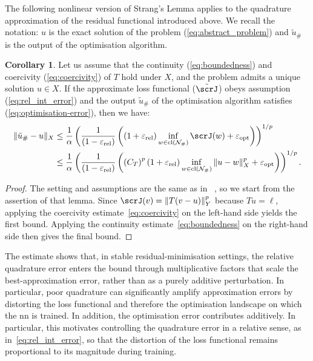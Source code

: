 \documentclass[oneside,reqno,11pt,a4paper]{amsart}
\theoremstyle{definition}
\newtheorem{corollary}{Corollary}[section]
\newcommand{\norm}[1]{\left\lVert #1 \right\rVert}
\begin{document}
The following nonlinear version of Strang's Lemma applies to the quadrature
approximation of the residual functional introduced above. We recall the
notation: $u$ is the exact solution of the problem
(\ref{eq:abstract_problem}) and $\tilde{u}_{\#}$ is the output of the
optimisation algorithm. 
\begin{corollary} \label{corollary:nonlinear-strang-rel}
  Let us assume that the continuity (\ref{eq:boundedness}) and coercivity
  (\ref{eq:coercivity}) of $T$ hold under $X$, and the problem admits a unique
  solution $u \in X$. If the approximate loss functional ($\tilde{\scrJ}$)
  obeys assumption (\ref{eq:rel_int_error}) and the output $\tilde{u}_{\#}$ of
  the optimisation algorithm satisfies (\ref{eq:optimisation-error}), then we have:
\begin{align}
  \| \tilde{u}_{\#} - u\|_X  
  & \leq \frac{1}{\alpha} \left(\frac{1}{\left(1 - \varepsilon_{\mathrm{rel}}\right)} \left( \left(1 + \varepsilon_{\mathrm{rel}}\right) \inf_{w \in \operatorname{cl}(\mathcal{N}_{\#})} \scrJ(w) + \varepsilon_{\mathrm{opt}} \right)\right)^{1/p} \\ 
  & \leq  \frac{1}{\alpha} \left(\frac{1}{\left(1 - \varepsilon_{\mathrm{rel}}\right)} \left( \left(C_T\right)^p \left(1 + \varepsilon_{\mathrm{rel}}\right) \inf_{w \in \operatorname{cl}(\mathcal{N}_{\#})} \|u - w\|^p_X + \varepsilon_{\mathrm{opt}} \right)\right)^{1/p}.
\end{align} 
\end{corollary}
\begin{proof}
  The setting and assumptions are the same as in
 ~, so we start from the assertion of
  that lemma. Since $\scrJ(v) = \norm{T(v -u)}^p_Y$ because $T u = \ell$, applying
  the coercivity estimate~\eqref{eq:coercivity} on the left-hand side yields
  the first bound. Applying the continuity estimate~\eqref{eq:boundedness} on
  the right-hand side then gives the final bound.
\end{proof}
%
The estimate shows that, in stable residual-minimisation settings, the relative quadrature error enters the bound through multiplicative factors that scale the best-approximation error, rather than as a purely additive perturbation. 
In particular, poor quadrature can significantly amplify approximation errors by distorting the loss functional and therefore the optimisation landscape on which the \ac{nn} is trained. In addition, the optimisation error contributes additively. In particular, this motivates controlling the quadrature error in a relative sense, as in~\eqref{eq:rel_int_error}, so that the distortion of the loss functional remains proportional to its magnitude during training.
\end{document}
